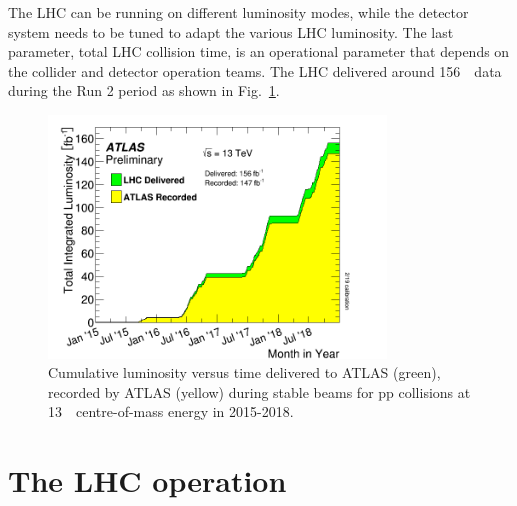 \par The LHC can be running on different luminosity modes, while the detector system needs to be tuned to adapt the various LHC luminosity. The last parameter, total LHC collision time, is an operational parameter that depends on the collider and detector operation teams. The LHC delivered around 156~\ifb~data during the Run 2 period as shown in Fig.~\ref{fig:lumi}.
\begin{figure}[htbp]
    \centering
    \includegraphics[width=0.8\textwidth]{chapters/c4/figures/intlumivstimeRun2}
    \caption{Cumulative luminosity versus time delivered to ATLAS (green), recorded by ATLAS (yellow) during stable beams for pp collisions at 13~\TeV~centre-of-mass energy in 2015-2018.}
    \label{fig:lumi}
\end{figure}

\section{The LHC operation}
\label{sec:lhcs1}

